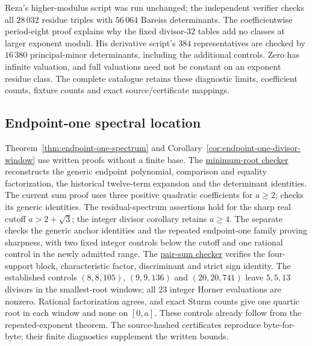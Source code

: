Reza's higher-modulus script was run unchanged; the independent verifier
checks all $28\,032$ residue triples with $56\,064$ Bareiss determinants.
The coefficientwise period-eight proof explains why the fixed divisor-$32$
tables add no classes at larger exponent moduli. His derivative script's
$384$ representatives are checked by $16\,380$ principal-minor determinants,
including the additional controls. Zero has infinite valuation, and full
valuations need not be constant on an exponent residue class. The complete
catalogue retains these diagnostic limits, coefficient counts, fixture
counts and exact source/certificate mappings.

\subsection{Endpoint-one spectral location}

Theorem~\ref{thm:endpoint-one-spectrum} and
Corollary~\ref{cor:endpoint-one-divisor-window} use written proofs without
a finite base. The
\href{https://github.com/the-omega-institute/ideal-intersection-laplacian/blob/d09cfdcc08f2a0b6c5b3abbd7d7a30bacc9030b4/scripts/check_endpoint_one_minimum_root.py}{minimum-root checker}
reconstructs the generic endpoint polynomial, comparison and equality
factorization, the historical twelve-term expansion and the determinant identities.
The current sum proof uses three positive quadratic coefficients for $a\geq2$;
 checks its generic identities.
The residual-spectrum assertions hold for the sharp real cutoff
$a>2+\sqrt3$; the integer divisor corollary retains $a\geq4$.
The separate  checks the
generic anchor identities and the repeated endpoint-one family proving
sharpness, with two fixed integer controls below the cutoff and one
rational control in the newly admitted range.
The
\href{https://github.com/the-omega-institute/ideal-intersection-laplacian/blob/fd02ed726d3ada4bbd5e401e8818739f3bddc371/scripts/check_endpoint_one_pair_sum_window.py}{pair-sum checker}
verifies the four-support block, characteristic factor, discriminant and
strict sign identity. The established controls $(8,8,105)$, $(9,9,136)$
and $(20,20,741)$ leave $5,5,13$ divisors in the smallest-root windows;
all $23$ integer Horner evaluations are nonzero. Rational factorization
agrees, and exact Sturm counts give one quartic root in each window and
none on $[0,a]$. These controls already follow from the repeated-exponent
theorem. The source-hashed certificates reproduce byte-for-byte; their
finite diagnostics supplement the written bounds.


